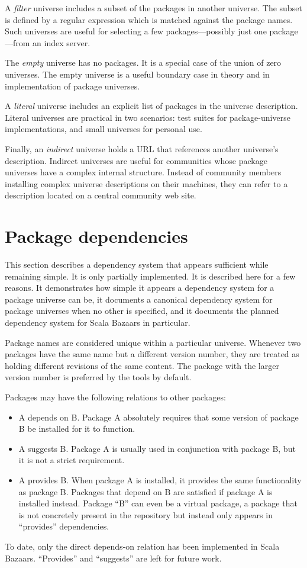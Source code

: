 \documentclass{article}
\begin{document}
A \emph{filter} universe includes a subset of the packages in another
universe.  The subset is defined by a regular expression which is
matched against the package names.  Such universes are useful for
selecting a few packages---possibly just one package---from an index
server.

The \emph{empty} universe has no packages.  It is a special case of the
union of zero universes.  The empty universe is a useful boundary
case in theory and in implementation of package universes.

A \emph{literal} universe includes an explicit list of packages in the
universe description.  Literal universes are practical in two
scenarios: test suites for package-universe implementations, and small
universes for personal use.

Finally, an \emph{indirect} universe holds a URL that references
another universe's description.  Indirect universes are useful for
communities whose package universes have a complex internal structure.
Instead of community members installing complex universe descriptions
on their machines, they can refer to a description located on a
central community web site.



\section{Package dependencies}
This section describes a dependency system that appears sufficient
while remaining simple.  It is only partially implemented.  It is
described here for a few reasons.  It demonstrates how simple it
appears a dependency system for a package universe can be, it
documents a canonical dependency system for package universes when no
other is specified, and it documents the planned dependency system
for Scala Bazaars in particular.

Package names are considered unique within a particular universe.
Whenever two packages have the same name but a different version
number, they are treated as holding different revisions of the same
content.  The package with the larger version number is preferred by
the tools by default.

Packages may have the following relations to other packages:
\begin{itemize}
\item A depends on B.  Package A absolutely requires that some
      version of package B be installed for it to function.
\item A suggests B.  Package A is usually used in conjunction with
      package B, but it is not a strict requirement.
\item A provides B.  When package A is installed, it provides the same
      functionality as package B.  Packages that depend on B are
      satisfied if package A is installed instead.  Package ``B'' can
      even be a virtual package, a package that is not concretely present
      in the repository but instead only appears in ``provides'' dependencies.
\end{itemize}
To date, only the direct depends-on relation has been implemented in
Scala Bazaars.  ``Provides'' and ``suggests'' are left for future
work.
\end{document}
